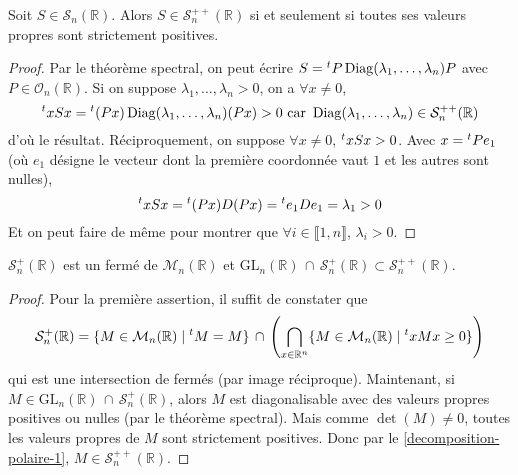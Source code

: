 




	\begin{lemma}
		\label{decomposition-polaire-1}
		Soit $S \in \mathcal{S}_n(\mathbb{R})$. Alors $S \in \mathcal{S}_n^{++}(\mathbb{R})$ si et seulement si toutes ses valeurs propres sont strictement positives.
	\end{lemma}

	\begin{proof}
		Par le théorème spectral, on peut écrire $S = \mathstrut ^t P \operatorname{Diag}(\lambda_1, \dots, \lambda_n) P$ avec $P \in \mathcal{O}_n(\mathbb{R})$. Si on suppose $\lambda_1, \dots, \lambda_n > 0$, on a $\forall x \neq 0$,
		\[ \mathstrut ^t x S x = \mathstrut ^t (Px) \operatorname{Diag}(\lambda_1, \dots, \lambda_n) (Px) > 0 \text{ car } \operatorname{Diag}(\lambda_1, \dots, \lambda_n) \in \mathcal{S}_n^{++}(\mathbb{R}) \]
		d'où le résultat.
		\newpar
		Réciproquement, on suppose $\forall x \neq 0$, $\mathstrut ^t x S x > 0$. Avec $x = \mathstrut ^t P e_1$ (où $e_1$ désigne le vecteur dont la première coordonnée vaut $1$ et les autres sont nulles),
		\[ \mathstrut ^t x S x = \mathstrut ^t (Px) D (Px) = \mathstrut ^t e_1 D e_1 = \lambda_1 > 0 \]
		Et on peut faire de même pour montrer que $\forall i \in \llbracket 1, n \rrbracket$, $\lambda_i > 0$.
	\end{proof}

	\begin{lemma}
		\label{decomposition-polaire-2}
		$\mathcal{S}_n^+(\mathbb{R})$ est un fermé de $\mathcal{M}_n(\mathbb{R})$ et $\mathrm{GL}_n(\mathbb{R}) \, \cap \, \mathcal{S}_n^{+}(\mathbb{R}) \subset \mathcal{S}_n^{++}(\mathbb{R})$.
	\end{lemma}

	\begin{proof}
		Pour la première assertion, il suffit de constater que
		\[ \mathcal{S}_n^+(\mathbb{R}) = \{ M \in \mathcal{M}_n(\mathbb{R}) \mid \mathstrut ^t M = M \} \, \cap \, \left( \bigcap_{x \in \mathbb{R}^n} \{ M \in \mathcal{M}_n(\mathbb{R}) \mid \mathstrut ^t x M x \geq 0 \} \right) \]
		qui est une intersection de fermés (par image réciproque). Maintenant, si $M \in \mathrm{GL}_n(\mathbb{R}) \, \cap \, \mathcal{S}_n^{+}(\mathbb{R})$, alors $M$ est diagonalisable avec des valeurs propres positives ou nulles (par le théorème spectral). Mais comme $\det(M) \neq 0$, toutes les valeurs propres de $M$ sont strictement positives. Donc par le \cref{decomposition-polaire-1}, $M \in \mathcal{S}_n^{++}(\mathbb{R})$.
	\end{proof}

